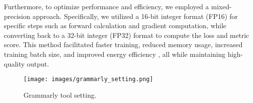 \documentclass[conference]{IEEEtran}
\begin{document}
Furthermore, to optimize performance and efficiency, we employed a mixed-precision approach. Specifically, we utilized a 16-bit integer format (FP16) for specific steps such as forward calculation and gradient computation, while converting back to a 32-bit integer (FP32) format to compute the loss and metric score. This method facilitated faster training, reduced memory usage, increased training batch size, and improved energy efficiency \cite{mixed-precision-training}, all while maintaining high-quality output.


\begin{figure}
  \texttt{[image: images/grammarly\_setting.png]}
  \caption{Grammarly tool setting.}
  \label{fig:grammarly_setting}
\end{figure}
\end{document}

